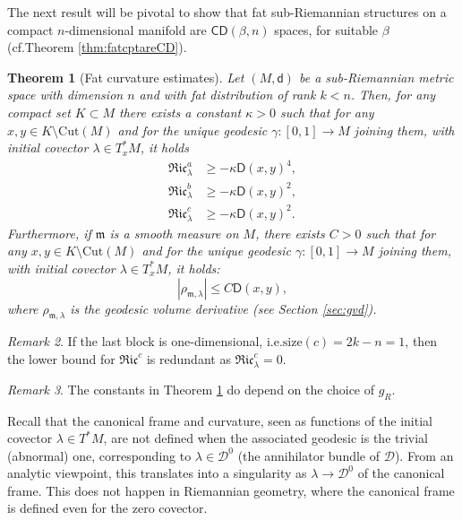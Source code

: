\documentclass[11pt,a4paper]{article}
\theoremstyle{plain}
\newtheorem{theorem}{Theorem}[section]
\theoremstyle{definition}
\theoremstyle{remark}
\newtheorem{remark}[theorem]{Remark}
\numberwithin{equation}{section}
\newcommand{\size}{\mathrm{size}}
\newcommand{\distr}{\mathscr{D}}
\newcommand{\CD}{\mathsf{CD}}
\newcommand{\mm}{\mathfrak m}
\newcommand{\sfd}{\mathsf d}
\newcommand{\sfD}{\mathsf D}
\begin{document}
The next result will be pivotal to show that fat sub-Riemannian structures on a compact $n$-dimensional manifold are $\CD(\beta,n)$ spaces, for suitable $\beta$ (cf.\@ Theorem \ref{thm:fatcptareCD}).

\begin{theorem}[Fat curvature estimates]\label{t:fattheorem}
Let $(M,\sfd)$ be a sub-Riemannian metric space with dimension $n$ and with fat distribution of rank $k< n$. Then, for any compact set $K\subset M$ there exists a constant $\kappa>0$ such that for any $x,y\in K\setminus \mathrm{Cut}(M)$ and for the unique geodesic $\gamma:[0,1]\to M$ joining them, with initial covector $\lambda \in T_x^*M$, it holds
\begin{align}
\mathfrak{Ric}^a_{\lambda} & \geq - \kappa \sfD(x,y)^4, \\
\mathfrak{Ric}^b_{\lambda} & \geq - \kappa \sfD(x,y)^2, \\
\mathfrak{Ric}^c_{\lambda} & \geq - \kappa \sfD(x,y)^2.
\end{align}
Furthermore, if $\mm$ is a smooth measure on $M$, there exists $C>0$ such that for any $x,y\in K\setminus \mathrm{Cut}(M)$ and for the unique geodesic $\gamma:[0,1]\to M$ joining them, with initial covector $\lambda\in T_x^*M$, it holds:
\begin{equation}
|\rho_{\mm,\lambda}| \leq C \sfD(x,y),
\end{equation}
where $\rho_{\mm,\lambda}$ is the geodesic volume derivative (see Section \ref{sec:gvd}).
\end{theorem}
\begin{remark}
If the last block is one-dimensional, i.e.\@ $\size(c)=2k-n=1$, then the lower bound for $\mathfrak{Ric}^c$ is redundant as $\mathfrak{Ric}^c_{\lambda} = 0$.
\end{remark}
\begin{remark}
The constants in Theorem \ref{t:fattheorem} do depend on the choice of $g_R$.
\end{remark}

Recall that the canonical frame and curvature, seen as functions of the initial covector $\lambda \in T^*M$, are not defined when the associated geodesic is the trivial (abnormal) one, corresponding to $\lambda \in \distr^0$ (the annihilator bundle of $\distr$). From an analytic viewpoint, this translates into a singularity as $\lambda \to \distr^0$ of the canonical frame. This does not happen in Riemannian geometry, where the canonical frame is defined even for the zero covector. 
\end{document}
